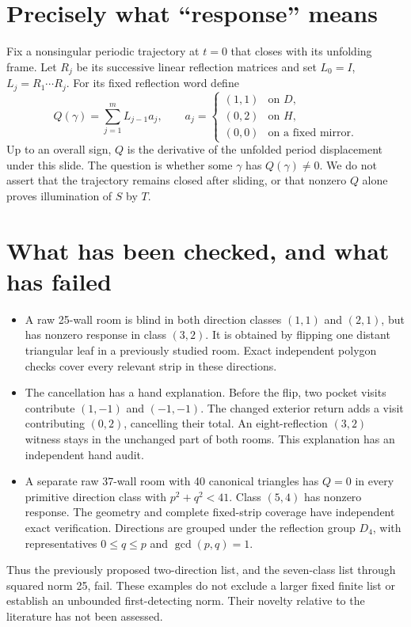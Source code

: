 \documentclass[11pt]{article}
\begin{document}
\section*{Precisely what ``response'' means}
Fix a nonsingular periodic trajectory at $t=0$ that closes with its unfolding frame. Let $R_j$ be its successive linear reflection matrices and set $L_0=I$, $L_j=R_1\cdots R_j$. For its fixed reflection word define
\[
 Q(\gamma)=\sum_{j=1}^m L_{j-1}a_j,\qquad
 a_j=\begin{cases}(1,1)&\text{on }D,\\(0,2)&\text{on }H,\\(0,0)&\text{on a fixed mirror.}\end{cases}
\]
Up to an overall sign, $Q$ is the derivative of the unfolded period displacement under this slide. The question is whether some $\gamma$ has $Q(\gamma)\ne0$. We do not assert that the trajectory remains closed after sliding, or that nonzero $Q$ alone proves illumination of $S$ by $T$.

\newpage
\section*{What has been checked, and what has failed}
\begin{itemize}
\item A raw 25-wall room is blind in both direction classes $(1,1)$ and $(2,1)$, but has nonzero response in class $(3,2)$. It is obtained by flipping one distant triangular leaf in a previously studied room. Exact independent polygon checks cover every relevant strip in these directions.
\item The cancellation has a hand explanation. Before the flip, two pocket visits contribute $(1,-1)$ and $(-1,-1)$. The changed exterior return adds a visit contributing $(0,2)$, cancelling their total. An eight-reflection $(3,2)$ witness stays in the unchanged part of both rooms. This explanation has an independent hand audit.
\item A separate raw 37-wall room with 40 canonical triangles has $Q=0$ in every primitive direction class with $p^2+q^2<41$. Class $(5,4)$ has nonzero response. The geometry and complete fixed-strip coverage have independent exact verification. Directions are grouped under the reflection group $D_4$, with representatives $0\le q\le p$ and $\gcd(p,q)=1$.
\end{itemize}
Thus the previously proposed two-direction list, and the seven-class list through squared norm 25, fail. These examples do not exclude a larger fixed finite list or establish an unbounded first-detecting norm. Their novelty relative to the literature has not been assessed.
\end{document}

